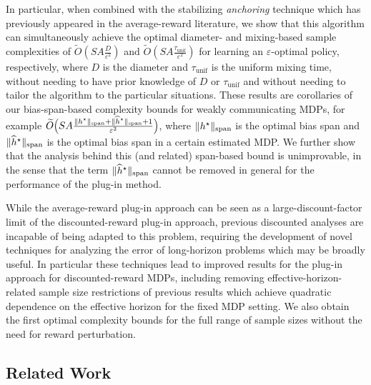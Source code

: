 \documentclass{article}
\theoremstyle{plain}
\theoremstyle{plain}
\theoremstyle{remark}
\theoremstyle{plain}
\theoremstyle{plain}
\newcommand{\hhat}{\widehat{h}}
\newcommand{\Otilde}{\widetilde{O}}
\newcommand{\tmix}{\tau_{\mathrm{unif}}}
\newcommand\cig[1]{\scalerel*[5.5pt]{\Big#1}{%
  \ensurestackMath{\addstackgap[1.5pt]{\big#1}}}}
\newcommand{\plugin}{plug-in\xspace}
\begin{document}
In particular, when combined with the stabilizing \textit{anchoring} technique which has previously appeared in the average-reward literature, we show that this algorithm can simultaneously achieve the optimal diameter- and mixing-based sample complexities of $\Otilde\left(SA \frac{D}{\varepsilon^2}\right)$ and $\Otilde\left(SA \frac{\tmix}{\varepsilon^2}\right)$ for learning an $\varepsilon$-optimal policy, respectively,
where $D$ is the diameter and $\tmix$ is the uniform mixing time, without needing to have prior knowledge of $D$ or $\tmix$ and without needing to tailor the algorithm to the particular situations. These results are corollaries of our bias-span-based complexity bounds for weakly communicating MDPs, for example $\Otilde\cig(SA \frac{\spannorm{h^\star} + \spannorm{\hhat^\star} + 1}{\varepsilon^2}\cig)$, where $\Vert h^\star\Vert _{\textnormal{span}}$ is the optimal bias span and $\spannorm{\hhat^\star}$ is the optimal bias span in a certain estimated MDP. We further show that the analysis behind this (and related) span-based bound is unimprovable, in the sense that the term $\spannorm{\hhat^\star}$ cannot be removed in general for the performance of the \plugin method.

While the average-reward \plugin approach can be seen as a large-discount-factor limit of the discounted-reward \plugin approach, previous discounted analyses are incapable of being adapted to this problem, requiring the development of novel techniques for analyzing the error of long-horizon problems which may be broadly useful.
In particular these techniques lead to improved results for the \plugin approach for discounted-reward MDPs, including removing effective-horizon-related sample size restrictions of previous results which achieve quadratic dependence on the effective horizon for the fixed MDP setting. 
We also obtain the first optimal complexity bounds for the full range of sample sizes without the need for reward perturbation.

\subsection{Related Work}
\end{document}
